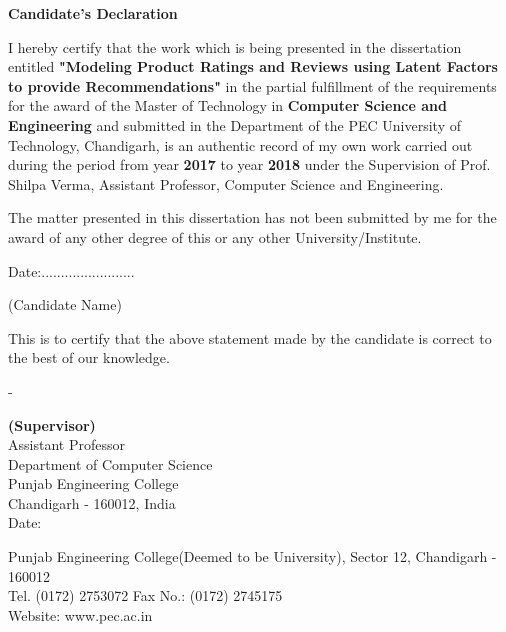 \documentclass[a4paper]{article}
\begin{document}
\vspace*{5px}
    \begin{figure}[h]
        {\par}
    \end{figure}
\justify
\begin{large}
\begin{center}
\textbf{Candidate's Declaration}
\end{center}


I hereby  certify  that  the  work  which  is  being  presented  in  the dissertation entitled \textbf{"Modeling Product Ratings and Reviews using Latent Factors to provide Recommendations"} in  the partial fulfillment of the requirements for the award of the Master of Technology in \textbf{Computer Science and Engineering} and submitted in the Department of the PEC University of Technology, Chandigarh, is  an  authentic record of my own work carried out during the period from year \textbf{2017} to year \textbf{2018} under the Supervision of Prof. Shilpa Verma, Assistant Professor, Computer Science and Engineering. \par
The  matter  presented  in  this dissertation has  not  been  submitted  by  me  for  the  award  of  any other degree of this or any other University/Institute. \par


\begin{minipage}{0.5\textwidth}
Date:........................
\end{minipage}%
\begin{minipage}{0.5\textwidth}
\tab(Candidate Name)
\end{minipage}

This  is  to  certify  that  the  above  statement  made  by  the  candidate  is  correct  to  the  best  of  our knowledge.

\vspace*{25px}
\begin{minipage}{0.5\textwidth}
-
\end{minipage}%
\begin{minipage}{0.5\textwidth}
\textbf{(Supervisor)}\\
Assistant Professor\\
Department of Computer Science\\
Punjab Engineering College\\
Chandigarh - 160012, India\\
Date: 
\end{minipage}

\vfill


\begin{center}
{\color{gray}
Punjab Engineering College(Deemed to be University), Sector 12, Chandigarh - 160012\\
Tel. (0172) 2753072 Fax No.: (0172) 2745175\\
Website: www.pec.ac.in}
\end{center}


\end{large}
\end{document}
